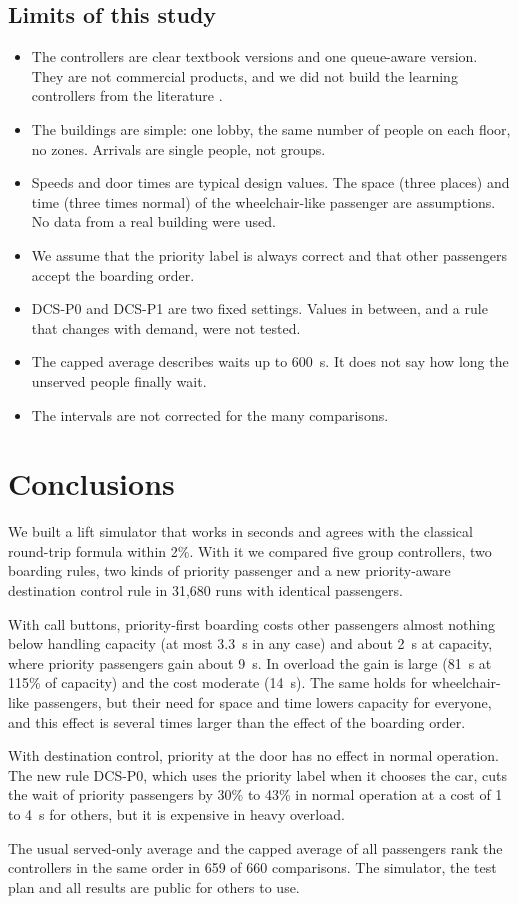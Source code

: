 \subsection{Limits of this study}
\begin{itemize}[itemsep=2pt]
\item The controllers are clear textbook versions and one queue-aware version. They are not commercial products, and we did not build the learning controllers from the literature \cite{crites1998,wan2024,wang2021}.
\item The buildings are simple: one lobby, the same number of people on each floor, no zones. Arrivals are single people, not groups.
\item Speeds and door times are typical design values. The space (three places) and time (three times normal) of the wheelchair-like passenger are assumptions. No data from a real building were used.
\item We assume that the priority label is always correct and that other passengers accept the boarding order.
\item DCS-P0 and DCS-P1 are two fixed settings. Values in between, and a rule that changes with demand, were not tested.
\item The capped average describes waits up to 600~s. It does not say how long the unserved people finally wait.
\item The intervals are not corrected for the many comparisons.
\end{itemize}

\section{Conclusions}\label{sec:conclusions}
We built a lift simulator that works in seconds and agrees with the classical round-trip formula within 2\%. With it we compared five group controllers, two boarding rules, two kinds of priority passenger and a new priority-aware destination control rule in 31,680 runs with identical passengers.

With call buttons, priority-first boarding costs other passengers almost nothing below handling capacity (at most 3.3~s in any case) and about 2~s at capacity, where priority passengers gain about 9~s. In overload the gain is large (81~s at 115\% of capacity) and the cost moderate (14~s). The same holds for wheelchair-like passengers, but their need for space and time lowers capacity for everyone, and this effect is several times larger than the effect of the boarding order.

With destination control, priority at the door has no effect in normal operation. The new rule DCS-P0, which uses the priority label when it chooses the car, cuts the wait of priority passengers by 30\% to 43\% in normal operation at a cost of 1 to 4~s for others, but it is expensive in heavy overload.

The usual served-only average and the capped average of all passengers rank the controllers in the same order in 659 of 660 comparisons. The simulator, the test plan and all results are public for others to use.
